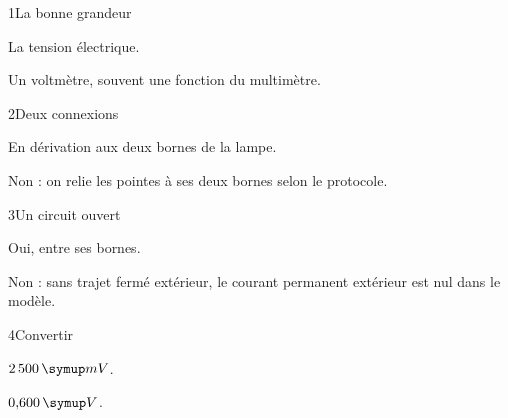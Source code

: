 \par\noindent\begin{minipage}{\linewidth}
\begin{corrige}{1}{La bonne grandeur}
\begin{questions}
\item La tension électrique.
\item Un voltmètre, souvent une fonction du multimètre.
\end{questions}
\end{corrige}
\end{minipage}
\par\noindent\begin{minipage}{\linewidth}
\begin{corrige}{2}{Deux connexions}
\begin{questions}
\item En dérivation aux deux bornes de la lampe.
\item Non : on relie les pointes à ses deux bornes selon le protocole.
\end{questions}
\end{corrige}
\end{minipage}
\par\noindent\begin{minipage}{\linewidth}
\begin{corrige}{3}{Un circuit ouvert}
\begin{questions}
\item Oui, entre ses bornes.
\item Non : sans trajet fermé extérieur, le courant permanent extérieur est nul dans le modèle.
\end{questions}
\end{corrige}
\end{minipage}
\par\noindent\begin{minipage}{\linewidth}
\begin{corrige}{4}{Convertir}
\begin{questions}
\item $2\,500\unite{mV}$.
\item $0{,}600\unite V$.
\end{questions}
\end{corrige}
\end{minipage}

